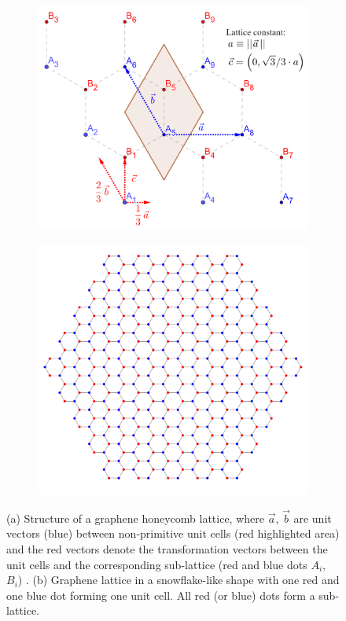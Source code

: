 \begin{figure}[H]
\centering
\begin{subfigure}[b]{.54\textwidth}
  \centering
  \includegraphics[width=\textwidth]{img/graphene_structure_1.PNG}
  \caption{}
  \label{fig:graphene_lattice}
\end{subfigure}
\hfill
\begin{subfigure}[b]{.45\textwidth}
  \centering
  \includegraphics[width=\textwidth]{img/snowflake_subsample_sketch.pdf}
  \caption{}
  \label{fig:graphene_snowflake}
\end{subfigure}
\caption{(a) Structure of a graphene honeycomb lattice, where $\Vec{a}$, $\Vec{b}$ are unit vectors (blue) between non-primitive unit cells (red highlighted area) and the red vectors denote the transformation vectors between the unit cells and the corresponding sub-lattice (red and blue dots $A_i$, $B_i$) \cite{Hofmann2015}. (b) Graphene lattice in a snowflake-like shape with one red and one blue dot forming one unit cell. All red (or blue) dots form a sub-lattice.}
\end{figure}

